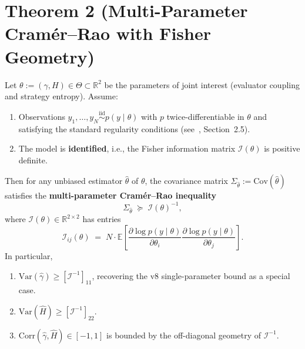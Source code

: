 %

\section*{Theorem 2 (Multi-Parameter Cramér--Rao with Fisher Geometry)}

\begin{theorem}
\label{thm:T2}
Let $\theta := (\gamma, H) \in \Theta \subset \mathbb{R}^2$ be the parameters of
joint interest (evaluator coupling and strategy entropy). Assume:
\begin{enumerate}[nosep,label=(\roman*)]
  \item Observations $y_1, \ldots, y_N \stackrel{\mathrm{iid}}{\sim}
        p(y \mid \theta)$ with $p$ twice-differentiable in $\theta$ and
        satisfying the standard regularity conditions
        (see~\citet{lehmanncasella1998}, Section~2.5).
  \item The model is \textbf{identified}, i.e., the Fisher information matrix
        $\mathcal{I}(\theta)$ is positive definite.
\end{enumerate}
Then for any unbiased estimator $\hat\theta$ of $\theta$, the covariance matrix
$\Sigma_{\hat\theta} := \mathrm{Cov}(\hat\theta)$ satisfies the
\textbf{multi-parameter Cramér--Rao inequality}
\[
  \Sigma_{\hat\theta} \;\succeq\; \mathcal{I}(\theta)^{-1},
\tag{CR}
\]
where $\mathcal{I}(\theta) \in \mathbb{R}^{2\times 2}$ has entries
\[
  \mathcal{I}_{ij}(\theta)
    \;=\; N \cdot \mathbb{E}\!\left[
        \frac{\partial \log p(y \mid \theta)}{\partial \theta_i}
        \frac{\partial \log p(y \mid \theta)}{\partial \theta_j}
      \right].
\]
In particular,
\begin{enumerate}[nosep,label=(\alph*)]
  \item $\mathrm{Var}(\hat\gamma) \ge [\mathcal{I}^{-1}]_{11}$, recovering the
        v8 single-parameter bound as a special case.
  \item $\mathrm{Var}(\hat H) \ge [\mathcal{I}^{-1}]_{22}$.
  \item $\mathrm{Corr}(\hat\gamma, \hat H) \in [-1, 1]$ is bounded by the
        off-diagonal geometry of $\mathcal{I}^{-1}$.
\end{enumerate}
\end{theorem}

